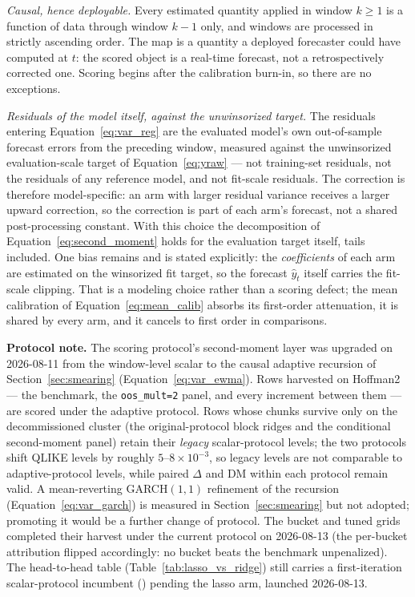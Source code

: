 \emph{Causal, hence deployable.} Every estimated quantity applied in
window $k \ge 1$ is a function of data through window $k-1$ only, and
windows are processed in strictly ascending order. The map is a quantity a
deployed forecaster could have computed at $t$: the scored object is a
real-time forecast, not a retrospectively corrected one. Scoring begins
after the calibration burn-in, so there are no exceptions.

\emph{Residuals of the model itself, against the unwinsorized target.} The
residuals entering Equation~\eqref{eq:var_reg} are the evaluated model's
own out-of-sample forecast errors from the preceding window, measured
against the unwinsorized evaluation-scale target of
Equation~\eqref{eq:yraw} --- not training-set residuals, not the residuals
of any reference model, and not fit-scale residuals. The correction is
therefore model-specific: an arm with larger residual variance receives a
larger upward correction, so the correction is part of each arm's
forecast, not a shared post-processing constant. With this choice the
decomposition of Equation~\eqref{eq:second_moment} holds for the
evaluation target itself, tails included. One bias remains and is stated
explicitly: the \emph{coefficients} of each arm are estimated on the
winsorized fit target, so the forecast $\hat{y}_t$ itself carries the
fit-scale clipping. That is a modeling choice rather than a scoring
defect; the mean calibration of Equation~\eqref{eq:mean_calib} absorbs its
first-order attenuation, it is shared by every arm, and it cancels to
first order in comparisons.


\textbf{Protocol note.}\label{app:protocol_note} The scoring protocol's second-moment layer was
upgraded on 2026-08-11 from the window-level scalar to the causal
adaptive recursion of Section~\ref{sec:smearing}
(Equation~\eqref{eq:var_ewma}). Rows harvested on Hoffman2 --- the
benchmark, the \texttt{oos\_mult=2} panel, and every increment between
them --- are scored under the adaptive protocol. Rows whose chunks
survive only on the decommissioned cluster (the original-protocol
block ridges and the conditional second-moment panel) retain their
\emph{legacy} scalar-protocol levels; the two protocols shift QLIKE
levels by roughly $5$--$8 \times 10^{-3}$, so legacy levels are not
comparable to adaptive-protocol levels, while paired $\Delta$ and DM
within each protocol remain valid. A mean-reverting GARCH$(1,1)$
refinement of the recursion (Equation~\eqref{eq:var_garch}) is
measured in Section~\ref{sec:smearing} but not adopted; promoting it
would be a further change of protocol. The bucket and tuned grids
completed their harvest under the current protocol on 2026-08-13 (the
per-bucket attribution flipped accordingly: no bucket beats the
benchmark unpenalized). The head-to-head table
(Table~\ref{tab:lasso_vs_ridge}) still carries a first-iteration
scalar-protocol incumbent (\unifAzeroQLIKEScalar{}) pending the lasso
arm, launched 2026-08-13.

